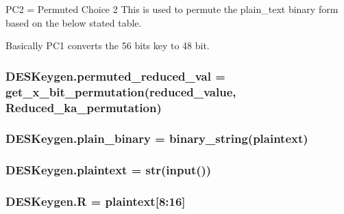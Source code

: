 P\+C2 = Permuted Choice 2 This is used to permute the plain\+\_\+text binary form based on the below stated table. 

Basically P\+C1 converts the 56 bits key to 48 bit. 
\subsubsection[{\texorpdfstring{permuted\+\_\+reduced\+\_\+val}{permuted_reduced_val}}]{\setlength{\rightskip}{0pt plus 5cm}D\+E\+S\+Keygen.\+permuted\+\_\+reduced\+\_\+val = {\bf get\+\_\+x\+\_\+bit\+\_\+permutation}({\bf reduced\+\_\+value}, {\bf Reduced\+\_\+ka\+\_\+permutation})}\hypertarget{namespaceDESKeygen_ad42968adaf55c4fd51e9901eb3237696}{}\label{namespaceDESKeygen_ad42968adaf55c4fd51e9901eb3237696}
\subsubsection[{\texorpdfstring{plain\+\_\+binary}{plain_binary}}]{\setlength{\rightskip}{0pt plus 5cm}D\+E\+S\+Keygen.\+plain\+\_\+binary = {\bf binary\+\_\+string}({\bf plaintext})}\hypertarget{namespaceDESKeygen_a493d3c517f0465c6e02e159d6fc7698e}{}\label{namespaceDESKeygen_a493d3c517f0465c6e02e159d6fc7698e}
\subsubsection[{\texorpdfstring{plaintext}{plaintext}}]{\setlength{\rightskip}{0pt plus 5cm}D\+E\+S\+Keygen.\+plaintext = str(input())}\hypertarget{namespaceDESKeygen_a2a0821ea3c5c35ce080f9935767b441b}{}\label{namespaceDESKeygen_a2a0821ea3c5c35ce080f9935767b441b}
\subsubsection[{\texorpdfstring{R}{R}}]{\setlength{\rightskip}{0pt plus 5cm}D\+E\+S\+Keygen.\+R = {\bf plaintext}\mbox{[}8\+:16\mbox{]}}\hypertarget{namespaceDESKeygen_a5e6262e2d5b5d262809ce5fac81261ac}{}\label{namespaceDESKeygen_a5e6262e2d5b5d262809ce5fac81261ac}
